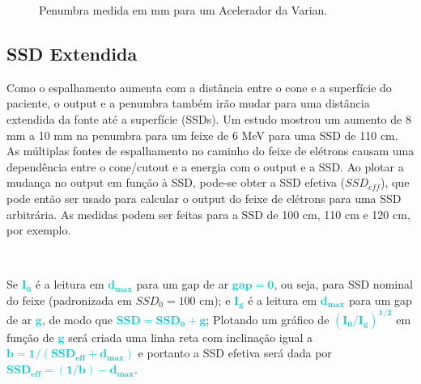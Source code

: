 \documentclass[11pt,a4paper]{article}
\newcounter{exemplo}
\begin{document}
	\begin{figure}[h]
		\centering
		\caption{Penumbra medida em mm para um Acelerador da Varian.}
		\label{fig:penumbraEletrons}
	\end{figure}

\subsection*{SSD Extendida}

	Como o espalhamento aumenta com a distância entre o cone e a superfície do paciente, o output e a penumbra também irão mudar para uma distância extendida da fonte até a superfície (SSDs). Um estudo mostrou um aumento de 8 mm a 10 mm na penumbra para um feixe de 6 MeV para uma SSD de 110 cm. As múltiplas fontes de espalhamento no caminho do feixe de elétrons causam uma dependência entre o  cone/cutout e a energia com o output e a SSD. Ao plotar a mudança no output em função à SSD, pode-se obter a SSD efetiva ($SSD_{eff}$), que pode então ser usado para calcular o output do feixe de elétrons para uma SSD arbitrária. As medidas podem ser feitas para a SSD de 100 cm, 110 cm e 120 cm, por exemplo. 

	\

	\begin{tcolorbox}[width=\textwidth, colback={white}, colbacktitle={DarkTurquoise!50!white}, title={$\bigstar$ \LobsterTwo{Determinação da $\mathbf{SSD_{eff}}$} $\bigstar $}, coltitle={CarnationPink}, colframe={DarkTurquoise}, fonttitle=\rmfamily\bfseries\Large]

		Se \textcolor{DarkTurquoise}{$\mathbf{I_0}$} é a leitura em \textcolor{DarkTurquoise}{$\mathbf{d_{max}}$} para um gap de ar \textcolor{DarkTurquoise}{$\mathbf{gap = 0}$}, ou seja, para SSD nominal do feixe (padronizada em $SSD_0 = 100$ cm); e \textcolor{DarkTurquoise}{$\mathbf{I_g}$} é a leitura em \textcolor{DarkTurquoise}{$\mathbf{d_{max}}$} para um gap de ar \textcolor{DarkTurquoise}{$\mathbf{g}$}, de modo que \textcolor{DarkTurquoise}{$\mathbf{SSD = SSD_0 + g}$}; Plotando um gráfico de \textcolor{DarkTurquoise}{$\mathbf{\left(I_0 / I_g\right)^{1/2}}$} em função de \textcolor{DarkTurquoise}{$\mathbf{g}$} será criada uma linha reta com inclinação igual a \textcolor{DarkTurquoise}{$\mathbf{b = 1 / (SSD_{eff} + d_{max})}$} e portanto a SSD efetiva será dada por \textcolor{DarkTurquoise}{$\mathbf{SSD_{eff} = (1/b) - d_{max}}$}.

	\end{tcolorbox}
\end{document}
